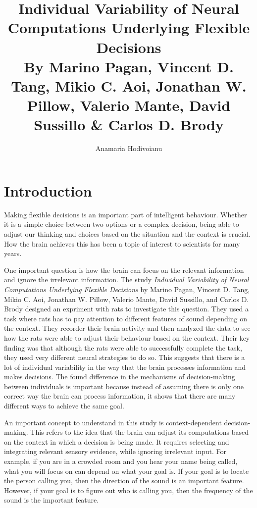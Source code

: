 \documentclass{article}
\title{Individual Variability of Neural Computations Underlying Flexible Decisions \\ By Marino Pagan, Vincent D. Tang, Mikio C. Aoi, Jonathan W. Pillow, Valerio Mante, David Sussillo \& Carlos D. Brody}
\author{Anamaria Hodivoianu}
\begin{document}
\maketitle

\section{Introduction}
Making flexible decisions is an important part of intelligent behaviour. Whether it is a simple choice between two options or a complex decision, being able to adjust our thinking and choices based on the  situation and the context is crucial. How the brain achieves this has been a topic of interest to scientists for many years. 

One important question is how the brain can focus on the relevant information and ignore the irrelevant information. The study \textit{Individual Variability of Neural Computations Underlying Flexible Decisions} by Marino Pagan, Vincent D. Tang, Mikio C. Aoi, Jonathan W. Pillow, Valerio Mante, David Sussillo, and Carlos D. Brody designed an expriment with rats to investigate this question. They used a task where rats has to pay attention to different features of sound depending on the context. They recorder their brain activity and then analyzed the data to see how the rats were able to adjust their behaviour based on the context. Their key finding was that although the rats were able to successfully complete the task, they used very different neural strategies to do so. This suggests that there is a lot of individual variability in the way that the brain processes information and makes decisions. The found difference in the mechanisms of decision-making between individuals is important because instead of assuming there is only one correct way the brain can process information, it shows that there are many different ways to achieve the same goal. 

An important concept to understand in this study is context-dependent decision-making. This refers to the idea that the brain can adjust its computations based on the context in which a decision is being made. It requires selecting and integrating relevant sensory evidence, while ignoring irrelevant input. For example, if you are in a crowded room and you hear your name being called, what you will focus on can depend on what your goal is. If your goal is to  locate the person calling you, then the direction of the sound is an important feature. However, if your goal is to figure out who is calling you, then the frequency of the sound is the important feature.
\end{document}
